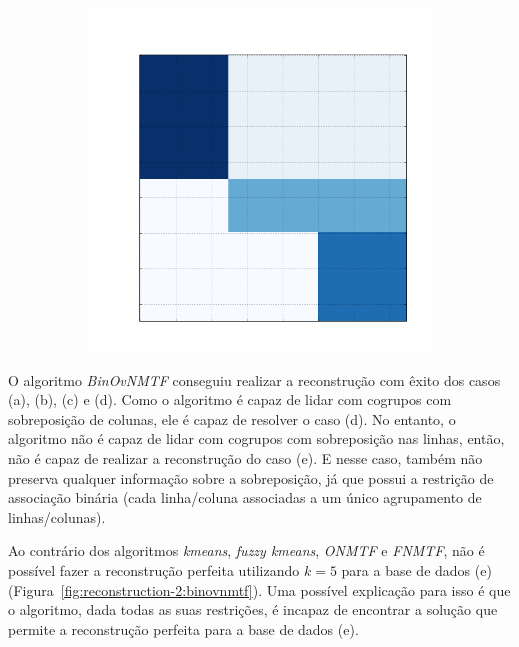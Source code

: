 \documentclass[
    12pt,                %
    oneside,            %
    a4paper,            %
    english,            %
    brazil                %
    ]{abntex2ppgsi}
\begin{document}
\begin{figure}[H]
\begin{subfigure}[b]{0.18\textwidth}
        \caption{}
    \end{subfigure}
    \begin{subfigure}[b]{0.18\textwidth}
        \includegraphics[width=\textwidth]{img/e-reconstruction-binovnmtf.png}
        \caption{}
    \end{subfigure}
    \label{fig:reconstruction:binovnmtf}
\end{figure}

O algoritmo \textit{BinOvNMTF} conseguiu realizar a reconstrução com êxito dos casos (a), (b), (c) e (d).
Como o algoritmo é capaz de lidar com cogrupos com sobreposição de colunas, ele é capaz de resolver o caso (d).
No entanto, o algoritmo não é capaz de lidar com cogrupos com sobreposição nas linhas, então, não é capaz de realizar a reconstrução do caso (e).
E nesse caso, também não preserva qualquer informação sobre a sobreposição, já que possui a restrição de associação binária (cada linha/coluna associadas a um único agrupamento de linhas/colunas).

Ao contrário dos algoritmos \textit{kmeans}, \textit{fuzzy kmeans}, \textit{ONMTF} e \textit{FNMTF}, não é possível fazer a reconstrução perfeita utilizando $k = 5$ para a base de dados (e) (Figura~\ref{fig:reconstruction-2:binovnmtf}).
Uma possível explicação para isso é que o algoritmo, dada todas as suas restrições, é incapaz de encontrar a solução que permite a reconstrução perfeita para a base de dados (e).
\end{document}
